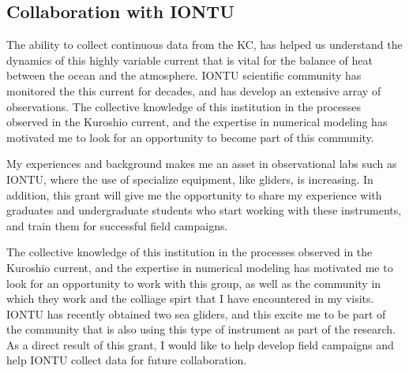 \documentclass[letterpaper, 12pt ]{article}
\begin{document}
\subsection{Collaboration with IONTU}

The ability to collect continuous data from the KC, has helped us understand the dynamics of this highly variable current that is vital for the balance of heat between the ocean and the atmosphere. IONTU scientific community has monitored the this current for decades, and has develop an extensive array of observations. The collective knowledge of this institution in the processes observed in the Kuroshio current, and the expertise in numerical modeling has motivated me to look for an opportunity to become part of this community. 

My experiences and background makes me an asset in observational labs such as IONTU, where the use of specialize equipment, like gliders, is increasing. In addition, this grant will give me the opportunity to share my experience with graduates and undergraduate students who start working with these instruments, and train them for successful field campaigns.



The collective knowledge of this institution in the processes observed in the Kuroshio current, and the expertise in numerical modeling has motivated me to look for an opportunity to work with this group, as well as the community in which they work and the colliage spirt that I have encountered in my visits.
IONTU has recently obtained two sea gliders, and this excite me to be part of the community that is also using this type of instrument as part of the research. As a direct result of this grant, I would like to help develop field campaigns and help IONTU collect data for future collaboration.
\end{document}
